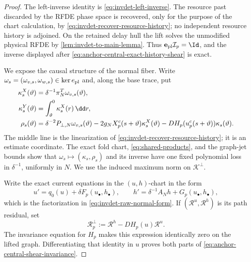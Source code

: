 \begin{proof}
The left-inverse identity is \cref{eq:invdet-left-inverse}.  The resource
past discarded by the RFDE phase space is recovered, only for the purpose of
the chart calculation, by \cref{eq:invdet-recover-resource-history}; no
independent resource history is adjoined.  On the retained delay hull the
lift solves the unmodified physical RFDE by
\cref{lem:invdet-to-main-lemma}.  Thus
\(\mathbf e_{\rm pl}\mathcal I_p=\Id\), and the inverse displayed after
\cref{eq:anchor-central-exact-history-shear} is exact.

We expose the causal structure of the normal fiber.  Write
\(\omega_s=(\omega_{v,s},\omega_{w,s})\in\ker e_{\rm pl}\) and, along
the base trace, put
\begin{align}
 \kappa_s^X(\vartheta)
  &=\delta^{-1}\pi_N^T\omega_{v,s}(\vartheta),\notag\\
 \kappa_s^Y(\vartheta)
  &=\int_\vartheta^0\kappa_s^X(r)\,\dd r,\notag\\
 \rho_s(\vartheta)
  &=\delta^{-2}P_{\perp,N}\omega_{v,s}(\vartheta)
    -2g_NX_p^c(s+\vartheta)\kappa_s^X(\vartheta)
    -DH_p(u_p^c(s+\vartheta))\kappa_s(\vartheta).
                                                               \label{eq:anchor-central-normal-fiber-coordinates}
\end{align}
The middle line is the linearization of
\cref{eq:invdet-recover-resource-history}; it is an estimate coordinate.
The exact fold chart, \cref{eq:shared-products}, and the graph-jet bounds
show that \(\omega_s\mapsto(\kappa_s,\rho_s)\) and its inverse have one
fixed polynomial loss in \(\delta^{-1}\), uniformly in \(N\).  We use the
induced maximum norm on \(\mathscr K^\perp\).

Write the exact current equations in the \((u,h)\)-chart in the form
\[
 u'=q_0(u)+\delta F_p(u_\bullet,h_\bullet),
 \qquad
 h'=\delta^{-1}A_Nh+G_p(u_\bullet,h_\bullet),
\]
which is the factorization in \cref{eq:invdet-raw-normal-form}.  If
\((\mathscr R^u,\mathscr R^h)\) is its path residual, set
\begin{equation}
 \mathscr R_p^\perp
 :=\mathscr R^h-DH_p(u)\mathscr R^u.               \label{eq:anchor-central-normal-row-shear}
\end{equation}
The invariance equation for \(H_p\) makes this expression identically zero
on the lifted graph.  Differentiating that identity in \(u\) proves both
parts of \cref{eq:anchor-central-shear-invariance}.


\end{proof}
